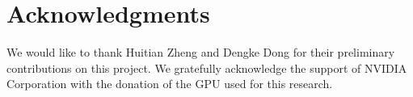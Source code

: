 \documentclass{sig-alternate-05-2015}
\begin{document}
\section{Acknowledgments}
We would like to thank Huitian Zheng and Dengke Dong for their preliminary contributions on this project. We gratefully acknowledge the support of NVIDIA Corporation with the donation of the GPU used for this research.

%

%
%
\end{document}
